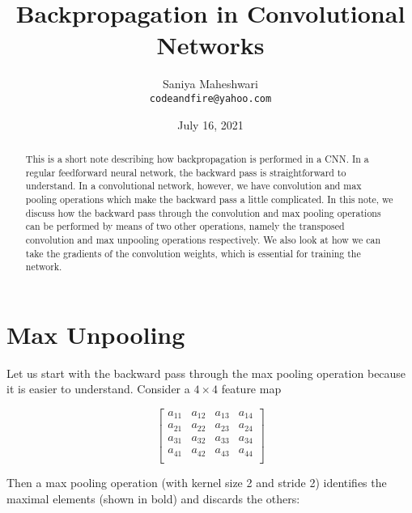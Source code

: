 \documentclass{article}[a4paper]
\begin{document}
\title{Backpropagation in Convolutional Networks}
\author{Saniya Maheshwari \\ \texttt{codeandfire@yahoo.com}}
\date{July 16, 2021}
\maketitle

\begin{abstract}
	This is a short note describing how backpropagation is performed in a CNN. In a regular feedforward neural network, the backward pass is straightforward to understand. In a convolutional network, however, we have convolution and max pooling operations which make the backward pass a little complicated. In this note, we discuss how the backward pass through the convolution and max pooling operations can be performed by means of two other operations, namely the transposed convolution and max unpooling operations respectively. We also look at how we can take the gradients of the convolution weights, which is essential for training the network.
\end{abstract}

\section{Max Unpooling}
Let us start with the backward pass through the max pooling operation because it is easier to understand. Consider a $4 \times 4$ feature map

\begin{equation*}
	\begin{bmatrix}
		a_{11} & a_{12} & a_{13} & a_{14} \\
		a_{21} & a_{22} & a_{23} & a_{24} \\
		a_{31} & a_{32} & a_{33} & a_{34} \\
		a_{41} & a_{42} & a_{43} & a_{44} \\
	\end{bmatrix}
\end{equation*}

Then a max pooling operation (with kernel size 2 and stride 2) identifies the maximal elements (shown in bold) and discards the others:
\end{document}
